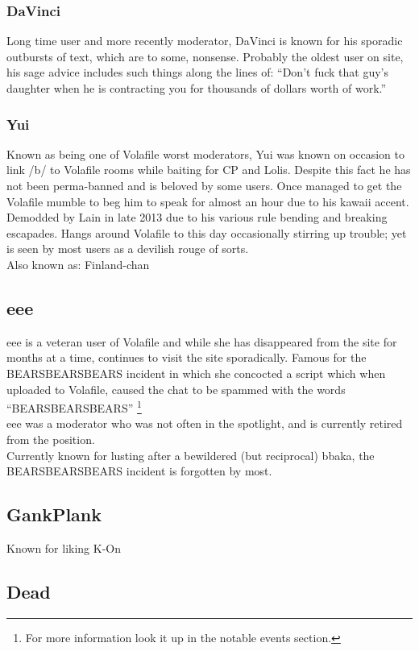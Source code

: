 \documentclass[12pt]{report}
\begin{document}
{\subsubsection{DaVinci}
	Long time user and more recently moderator, DaVinci is known for his sporadic outbursts of text, which are to some, nonsense. Probably the oldest user on site, his sage advice includes such things along the lines of: ``Don't fuck that guy's daughter when he is contracting you for thousands of dollars worth of work.'' 
\vfill
\pagebreak
\subsubsection{Yui}
	Known as being one of Volafile worst moderators, Yui was known on occasion to link /b/ to Volafile rooms while baiting for CP and Lolis. Despite this fact he has not been perma-banned and is beloved by some users. Once managed to get the Volafile mumble to beg him to speak for almost an hour due to his kawaii accent. Demodded by Lain in late 2013 due to his various rule bending and breaking escapades. Hangs around Volafile to this day occasionally stirring up trouble; yet is seen by most users as a devilish rouge of sorts.
	\\
	Also known as: Finland-chan

\subsection{eee}
	eee is a veteran user of Volafile and while she has disappeared from the site for months at a time, continues to visit the site sporadically. Famous for the BEARSBEARSBEARS incident in which she concocted a script which when uploaded to Volafile, caused the chat to be spammed with the words ``BEARSBEARSBEARS''
	\footnote{For more information look it up in the notable events section.}\\
eee was a moderator who was not often in the spotlight, and is currently retired from the position. \\Currently known for lusting after a bewildered (but reciprocal) bbaka, the BEARSBEARSBEARS incident is forgotten by most.

\subsection{GankPlank}
Known for liking K-On 

\subsection{Dead}
}
\end{document}
